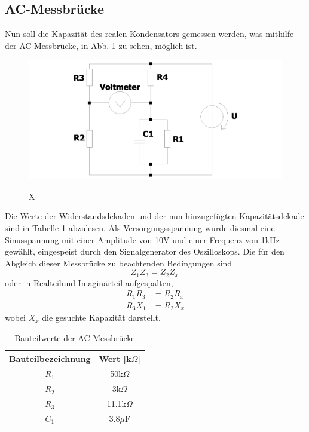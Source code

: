 \subsection{AC-Messbrücke}
Nun soll die Kapazität des realen Kondensators gemessen werden, was mithilfe der AC-Messbrücke, in Abb. \ref{fig:ac_messbruecke} zu sehen, möglich ist. 
\begin{figure}[H]
	\includegraphics[width=\textwidth]{./img/ch3/AC_Wheatstone_Messbruecke.png}
	\label{fig:ac_messbruecke}
	\caption{X}
\end{figure}
Die Werte der Widerstandsdekaden und der nun hinzugefügten Kapazitätsdekade sind in Tabelle \ref{tb:ac_bt} abzulesen. Als Versorgungsspannung wurde diesmal eine Sinusspannung mit einer Amplitude von 10V und einer Frequenz von 1kHz gewählt, eingespeist durch den Signalgenerator des Oszilloskops. Die für den Abgleich dieser Messbrücke zu beachtenden Bedingungen sind
\begin{equation}
	Z_1 Z_3 = Z_2 Z_x\,
\end{equation}
oder in Realteilund Imaginärteil aufgespalten, 
\begin{align*}
	R_1 R_3 &= R_2 R_x \\ 
 	R_3 X_1 &= R_2 X_x 
\end{align*}
wobei $X_x$ die gesuchte Kapazität darstellt.
\begin{table}[h]
	\begin{tabular}{|c|c|}
	\hline 
	Bauteilbezeichnung & Wert [k$\Omega$] \\ 
	\hline 
	$R_1$ & 50k$\Omega$ \\ 
	\hline 
	$R_2$ & 3k$\Omega$ \\ 
	\hline 
	$R_3$ & 11.1k$\Omega$ \\ 
	\hline 
	$C_1$ & 3.8$\mu$F \\ 
	\hline 
	\end{tabular}
	\centering
	\label{tb:ac_bt}
	\caption{Bauteilwerte der AC-Messbrücke}
\end{table}
